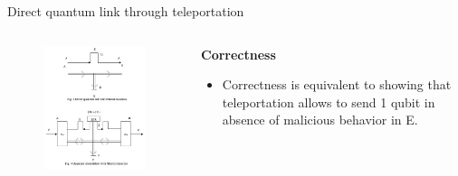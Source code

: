 \documentclass[final]{beamer}
\newlength{\twocolwid}
\begin{document}
\begin{frame}[t]
\begin{columns}[t]
\begin{column}{\twocolwid}
\begin{columns}[t,totalwidth=\twocolwid]
\begin{column}{\twocolwid}
\begin{block}{Direct quantum link through teleportation}
\begin{columns}
    \begin{column}{.40 \textwidth} %
        \centering
       \begin{figure}
         \includegraphics[width=0.95\linewidth]{direct_quantum_link_filtered.jpg}
       \end{figure}
    \end{column}
    \hfill%
     \begin{column}{.60\textwidth} %
       \centering
       \textbf{Correctness}\\[.2cm]
       
       \begin{itemize}
           \item Correctness is equivalent to showing that teleportation allows to send 1 qubit in absence of malicious behavior in E.
       \end{itemize}
    \end{column}%
  \end{columns}
  
  \vskip 2cm
  \begin{columns}
  

\end{columns}
\end{block}
\end{column}
\end{columns}
\end{column}
\end{columns}
\end{frame}
\end{document}
